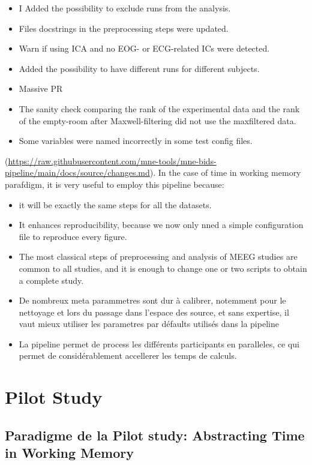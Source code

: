 \begin{itemize}
    \item I Added the possibility to exclude runs from the analysis.
    \item Files docstrings in the preprocessing steps were updated.
    \item Warn if using ICA and no EOG- or ECG-related ICs were detected.
    \item Added the possibility to have different runs for different subjects.
    \item Massive PR
    \item The sanity check comparing the rank of the experimental data and the rank of the empty-room after Maxwell-filtering did not use the maxfiltered data.
    \item Some variables were named incorrectly in some test config files.
\end{itemize}

(\url{https://raw.githubusercontent.com/mne-tools/mne-bids-pipeline/main/docs/source/changes.md}).
In the case of time in working memory parafdigm, it is very useful to employ this pipeline because:
\begin{itemize}
    \item it will be exactly the same steps for all the datasets.
    \item It enhances reproducibility, because we now only nned a simple configuration file to reproduce every figure.
    \item The most classical steps of preprocessing and analysis of MEEG studies are common to all studies, and it is enough to change one or two scripts to obtain a complete study.
    \item De nombreux meta parammetres sont dur à calibrer, notemment pour le nettoyage et lors du passage dans l'espace des source, et sans expertise, il vaut mieux utiliser les parametres par défaults utilisés dans la pipeline
    \item La pipeline permet de process les différents participants en paralleles, ce qui permet de considérablement accellerer les temps de calculs.
\end{itemize}

\section{Pilot Study}
\subsection{Paradigme de la Pilot study: Abstracting Time in Working Memory}


